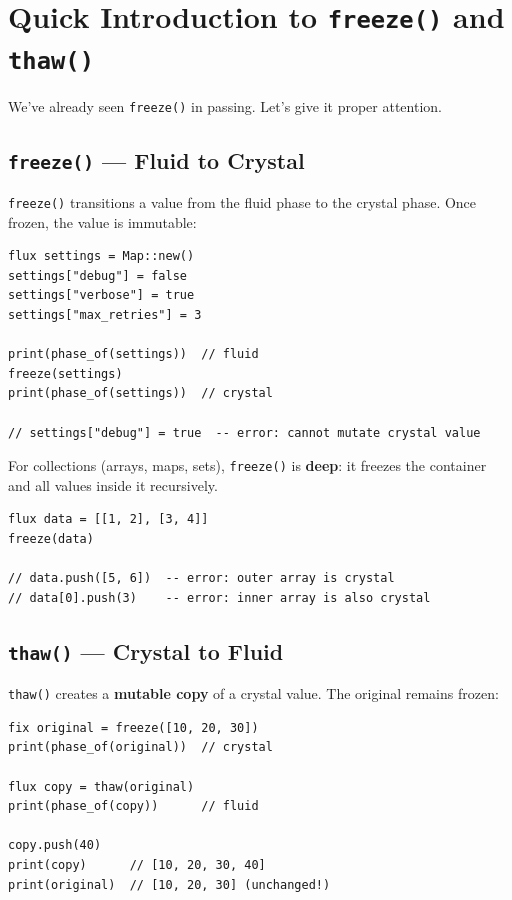 \section{Quick Introduction to \texttt{freeze()} and \texttt{thaw()}}\label{sec:freeze-thaw}

We've already seen \lstinline|freeze()| in passing.
Let's give it proper attention.

\subsection{\texttt{freeze()} --- Fluid to Crystal}\label{subsec:freeze-detail}

\lstinline|freeze()| transitions a value from the fluid phase to the crystal phase.
Once frozen, the value is immutable:

\begin{lstlisting}[language=Lattice, caption={Freezing a value}]
flux settings = Map::new()
settings["debug"] = false
settings["verbose"] = true
settings["max_retries"] = 3

print(phase_of(settings))  // fluid
freeze(settings)
print(phase_of(settings))  // crystal

// settings["debug"] = true  -- error: cannot mutate crystal value
\end{lstlisting}

For collections (arrays, maps, sets), \lstinline|freeze()| is \textbf{deep}: it freezes the container and all values inside it recursively.

\begin{lstlisting}[language=Lattice, caption={Deep freeze}]
flux data = [[1, 2], [3, 4]]
freeze(data)

// data.push([5, 6])  -- error: outer array is crystal
// data[0].push(3)    -- error: inner array is also crystal
\end{lstlisting}

\subsection{\texttt{thaw()} --- Crystal to Fluid}\label{subsec:thaw-detail}

\lstinline|thaw()| creates a \textbf{mutable copy} of a crystal value.
The original remains frozen:

\begin{lstlisting}[language=Lattice, caption={Thawing a frozen value}]
fix original = freeze([10, 20, 30])
print(phase_of(original))  // crystal

flux copy = thaw(original)
print(phase_of(copy))      // fluid

copy.push(40)
print(copy)      // [10, 20, 30, 40]
print(original)  // [10, 20, 30] (unchanged!)
\end{lstlisting}

